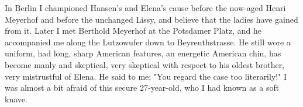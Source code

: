 In Berlin I championed Hansen's and Elena's cause before the now-aged Henri Meyerhof and before the unchanged Lissy, and believe that the ladies have gained from it. Later I met Berthold Meyerhof at the Potsdamer Platz, and he accompanied me along the Lutzowufer down to Beyreuthstrasse. He still wore a uniform, had long, sharp American features, an energetic American chin, has become manly and skeptical, very skeptical with respect to his oldest brother, very mistrustful of Elena. He said to me: "You regard the case too literarily!" I was almost a bit afraid of this secure 27-year-old, who I had known as a soft knave.

\missing
